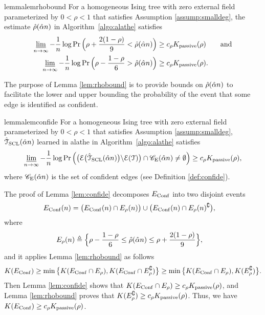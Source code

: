 \begin{restatable}{lemma}{lemrhobound}
\label{lem:rhobound}
For a homogeneous Ising tree with zero external field parameterized by $0<\rho<1$ that satisfies Assumption \ref{assump:smalldeg}, the estimate $\hat{\rho}(\hat{\alpha} n)$ in Algorithm~\ref{algo:alathe} satisfies 
\begin{align}
	\varliminf_{n\rightarrow\infty}-\frac{1}{n}\log\Pr\Big(\rho+\frac{2(1-\rho)}{9}<\hat{\rho}(\hat{\alpha} n)\Big)&\geq c_{\rho}K _{{\rm passive}}(\rho)\qquad\mbox{and}\\ \varliminf_{n\rightarrow\infty}-\frac{1}{n}\log\Pr\Big(\rho-\frac{1-\rho}{6}>\hat{\rho}(\hat{\alpha} n)\Big)&\geq c_{\rho}K _{{\rm passive}}(\rho).
\end{align}
\end{restatable}
The purpose of Lemma \ref{lem:rhobound} is to provide   bounds on $\hat{\rho}(\hat{\alpha} n)$ to facilitate the  lower  and upper bounding the probability of the event that some edge is identified as confident.
\begin{restatable}{lemma}{lemconfide}
\label{lem:confide}
For a homogeneous Ising tree with zero external field parameterized by $0<\rho<1$ that satisfies Assumption \ref{assump:smalldeg}, $\hat{\mathcal{T}}_{\rm{SCL}}(\hat{\alpha} n)$ learned in  \ac{alathe} in Algorithm~\ref{algo:alathe} satisfies
\begin{align} 
	\varliminf_{n\rightarrow\infty}-\frac{1}{n}\log\Pr\Big(\big(\mathcal{E}\big(\hat{\mathcal{T}}_{\rm{SCL}}(\hat{\alpha} n)\big)\backslash \mathcal{E}(\mathcal{T})\big)\cap \mathscr{C}_{\mathrm{E}}(\hat{\alpha} n)\neq \emptyset\Big)\geq c_{\rho}K _{{\rm passive}}(\rho),\label{ieq:confide}
\end{align}
where $\mathscr{C}_{\mathrm{E}}(\hat{\alpha} n)$ is the set of confident edges (see Definition \ref{def:confide}). 
\end{restatable}
The proof of Lemma \ref{lem:confide} decomposes $E_{{\rm Conf}}$ into two disjoint events
\begin{align}
	E_{{\rm Conf}}(n)&=\big(E_{{\rm Conf}}(n)\cap E_{\rho}(n)\big)\cup\big(E_{{\rm Conf}}(n)\cap E_{\rho}(n)^{\complement}\big),
\end{align}
where 
\begin{align}
	E_{\rho}(n)&\triangleq\Big\{\rho-\frac{1-\rho}{6}\leq\hat{\rho}(\hat{\alpha} n)\leq\rho+\frac{2(1-\rho)}{9}\Big\},
\end{align}
and it applies  Lemma \ref{lem:rhobound} as follows
\begin{align}
    K (E_{{\rm Conf}})\geq\min \big\{K (E_{{\rm Conf}}\cap E_{\rho}),K (E_{{\rm Conf}}\cap E_{\rho}^{\complement})\big\}\geq \min \big\{K (E_{{\rm Conf}}\cap E_{\rho}),K (E_{\rho}^{\complement})\big\}.
\end{align}
Then Lemma \ref{lem:confide} shows that $K (E_{{\rm Conf}}\cap E_{\rho})\geq c_{\rho}K _{{\rm passive}}(\rho)$, and Lemma \ref{lem:rhobound} proves that $K (E_{\rho}^{\complement})\geq c_{\rho}K _{{\rm passive}}(\rho)$. Thus, we have $K (E_{{\rm Conf}})\geq c_{\rho}K _{{\rm passive}}(\rho)$.



